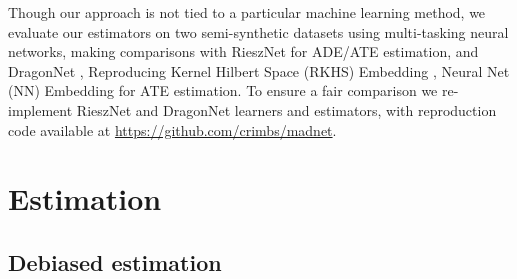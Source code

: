Though our approach is not tied to a particular machine learning method, we evaluate our estimators on two semi-synthetic datasets using multi-tasking neural networks, making comparisons with RieszNet \citep{Chernozhukov2022} for ADE/ATE estimation, and DragonNet \citep{Shi2019}, Reproducing Kernel Hilbert Space (RKHS) Embedding \citep{Singh2023}, Neural Net (NN) Embedding \citep{Xu2022} for ATE estimation. %
To ensure a fair comparison we re-implement RieszNet and DragonNet learners and estimators, with reproduction code available at \url{https://github.com/crimbs/madnet}.

\section{Estimation}

\subsection{Debiased estimation}
\label{sect:standard_theory}

